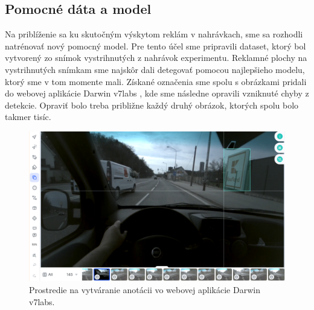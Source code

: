 
\subsection{Pomocné dáta a model}

Na priblíženie sa ku skutočným výskytom reklám v nahrávkach, sme sa rozhodli natrénovať nový pomocný model. Pre tento účel sme pripravili dataset, ktorý bol vytvorený zo snímok vystrihnutých z nahrávok experimentu. Reklamné plochy na vystrihnutých snímkam sme najskôr dali detegovať pomocou najlepšieho modelu, ktorý sme v tom momente mali. Získané označenia sme spolu s obrázkami pridali do webovej aplikácie Darwin v7labs \cite{v7}, kde sme následne opravili vzniknuté chyby z detekcie. Opraviť bolo treba približne každý druhý obrázok, ktorých spolu bolo takmer tisíc.

\begin{figure}[ht]
     \centering
     \includegraphics[width=1\textwidth]{images/04/lab.png}
     \caption{Prostredie na vytváranie anotácii vo webovej aplikácie Darwin v7labs.}
     \label{img:lab}
 \end{figure}

